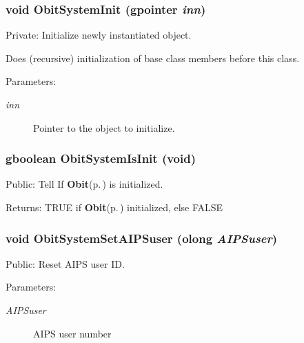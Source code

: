\subsubsection{\setlength{\rightskip}{0pt plus 5cm}void Obit\-System\-Init (gpointer {\em inn})}\label{ObitSystem_8c_a6}


Private: Initialize newly instantiated object. 

Does (recursive) initialization of base class members before this class. \begin{Desc}
\item[Parameters:]
\begin{description}
\item[{\em inn}]Pointer to the object to initialize. \end{description}
\end{Desc}
\subsubsection{\setlength{\rightskip}{0pt plus 5cm}gboolean Obit\-System\-Is\-Init (void)}\label{ObitSystem_8c_a20}


Public: Tell If {\bf Obit}{\rm (p.\,\pageref{structObit})} is initialized. 

\begin{Desc}
\item[Returns:]TRUE if {\bf Obit}{\rm (p.\,\pageref{structObit})} initialized, else FALSE \end{Desc}
\subsubsection{\setlength{\rightskip}{0pt plus 5cm}void Obit\-System\-Set\-AIPSuser ({\bf olong} {\em AIPSuser})}\label{ObitSystem_8c_a26}


Public: Reset AIPS user ID. 

\begin{Desc}
\item[Parameters:]
\begin{description}
\item[{\em AIPSuser}]AIPS user number \end{description}
\end{Desc}

